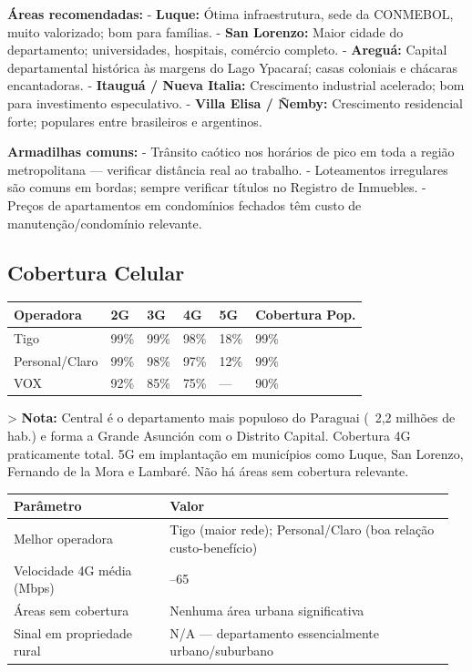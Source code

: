 \textbf{Áreas recomendadas:}
- \textbf{Luque:} Ótima infraestrutura, sede da CONMEBOL, muito valorizado; bom para famílias.
- \textbf{San Lorenzo:} Maior cidade do departamento; universidades, hospitais, comércio completo.
- \textbf{Areguá:} Capital departamental histórica às margens do Lago Ypacaraí; casas coloniais e chácaras encantadoras.
- \textbf{Itauguá / Nueva Italia:} Crescimento industrial acelerado; bom para investimento especulativo.
- \textbf{Villa Elisa / Ñemby:} Crescimento residencial forte; populares entre brasileiros e argentinos.

\textbf{Armadilhas comuns:}
- Trânsito caótico nos horários de pico em toda a região metropolitana --- verificar distância real ao trabalho.
- Loteamentos irregulares são comuns em bordas; sempre verificar títulos no Registro de Inmuebles.
- Preços de apartamentos em condomínios fechados têm custo de manutenção/condomínio relevante.




\subsection{Cobertura Celular}



{\small
\setlength{\tabcolsep}{3pt}
\renewcommand{\arraystretch}{1.12}
{\small
\begin{tabularx}{\linewidth}{lXXXXX}
\toprule
Operadora & 2G & 3G & 4G & 5G & Cobertura Pop. \\
\midrule
Tigo & 99\% & 99\% & 98\% & 18\% & 99\% \\
Personal/Claro & 99\% & 98\% & 97\% & 12\% & 99\% \\
VOX & 92\% & 85\% & 75\% & --- & 90\% \\
\bottomrule
\end{tabularx}
}
}

> \textbf{Nota:} Central é o departamento mais populoso do Paraguai (~2,2 milhões de hab.) e forma a Grande Asunción com o Distrito Capital. Cobertura 4G praticamente total. 5G em implantação em municípios como Luque, San Lorenzo, Fernando de la Mora e Lambaré. Não há áreas sem cobertura relevante.


{\small
\setlength{\tabcolsep}{3pt}
\renewcommand{\arraystretch}{1.12}
\begin{tabularx}{\linewidth}{>{\raggedright\arraybackslash}p{0.34\linewidth} >{\raggedright\arraybackslash}p{0.62\linewidth}}
\toprule
Parâmetro & Valor \\
\midrule
Melhor operadora & Tigo (maior rede); Personal/Claro (boa relação custo-benefício) \\
Velocidade 4G média (Mbps) & 40--65 \\
Áreas sem cobertura & Nenhuma área urbana significativa \\
Sinal em propriedade rural & N/A --- departamento essencialmente urbano/suburbano \\
\bottomrule
\end{tabularx}
}


